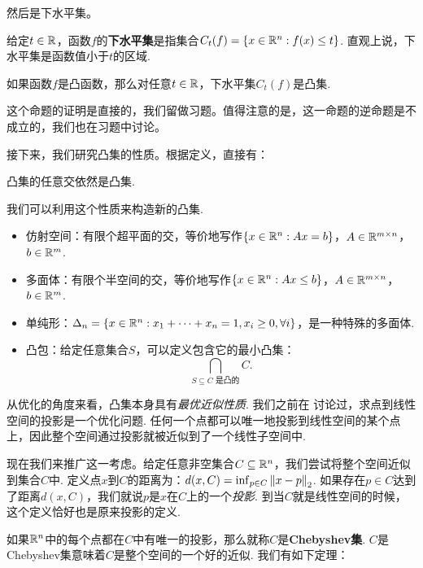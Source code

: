 然后是下水平集。
\begin{definition}[下水平集]
    给定$t\in\mathbb{R}$，函数$f$的\textbf{下水平集}是指集合$C_t(f)=\{x\in\mathbb{R}^n:f(x)\leq t\}$. 直观上说，下水平集是函数值小于$t$的区域.
\end{definition}

\begin{proposition}\label{prop:level-set}
    如果函数$f$是凸函数，那么对任意$t\in\mathbb{R}$，下水平集$C_t(f)$是凸集.
\end{proposition}
这个命题的证明是直接的，我们留做习题。值得注意的是，这一命题的逆命题是不成立的，我们也在习题中讨论。

接下来，我们研究凸集的性质。根据定义，直接有：

\begin{proposition}\label{prop:convex-set-intersect}
    凸集的任意交依然是凸集.
\end{proposition}
我们可以利用这个性质来构造新的凸集.
\begin{example}
\begin{itemize}
    \item 仿射空间：有限个超平面的交，等价地写作$\{x\in\mathbb{R}^n:Ax=b\}$，$A\in\mathbb{R}^{m\times n}$，$b\in\mathbb{R}^m$.
    \item 多面体：有限个半空间的交，等价地写作$\{x\in\mathbb{R}^n:Ax\leq b\}$，$A\in\mathbb{R}^{m\times n}$，$b\in\mathbb{R}^m$.
    \item 单纯形：$\Delta_n=\{x\in\mathbb{R}^n:x_1+\dots+x_n=1,x_i\geq 0,\forall i\}$，是一种特殊的多面体.
    \item 凸包：给定任意集合$S$，可以定义包含它的最小凸集：
    \[\bigcap_{S\subseteq C\text{ 是凸的}} C.\]
\end{itemize}
\end{example}

从优化的角度来看，凸集本身具有\emph{最优近似性质}. 我们之前在 讨论过，求点到线性空间的投影是一个优化问题. 任何一个点都可以唯一地投影到线性空间的某个点上，因此整个空间通过投影就被近似到了一个线性子空间中. 

现在我们来推广这一考虑。给定任意非空集合$C\subseteq\mathbb{R}^n$，我们尝试将整个空间近似到集合$C$中. 定义点$x$到$C$的距离为：$d(x,C)=\inf_{p\in C}\left\|x-p\right\|_2$. 如果存在$p\in C$达到了距离$d(x,C)$，我们就说$p$是$x$在$C$上的一个\emph{投影}. 到当$C$就是线性空间的时候，这个定义恰好也是原来投影的定义.

如果$\mathbb{R}^n$中的每个点都在$C$中有唯一的投影，那么就称$C$是\textbf{Chebyshev集}. $C$是Chebyshev集意味着$C$是整个空间的一个好的近似. 我们有如下定理：

